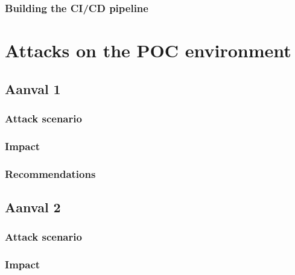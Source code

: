 \subsubsection{
{Building the CI/CD pipeline}}
\label{sec:Bouwen van de CD pipeline}

\section{
{Attacks on the POC environment}}
\label{sec:Aanvallen op de POC omgeving}

\subsection{
{Aanval 1}}
\label{sec:Aanval 1}

\subsubsection{
{Attack scenario}}
\label{sec:Aanval scenario}

\subsubsection{
{Impact}}
\label{sec:Impact}

\subsubsection{
{Recommendations}}
\label{sec:Aanbevelingen}

\subsection{
{Aanval 2}}
\label{sec:Aanval 2}

\subsubsection{
{Attack scenario}}
\label{sec:Aanval scenario}

\subsubsection{
{Impact}}
\label{sec:Impact}

